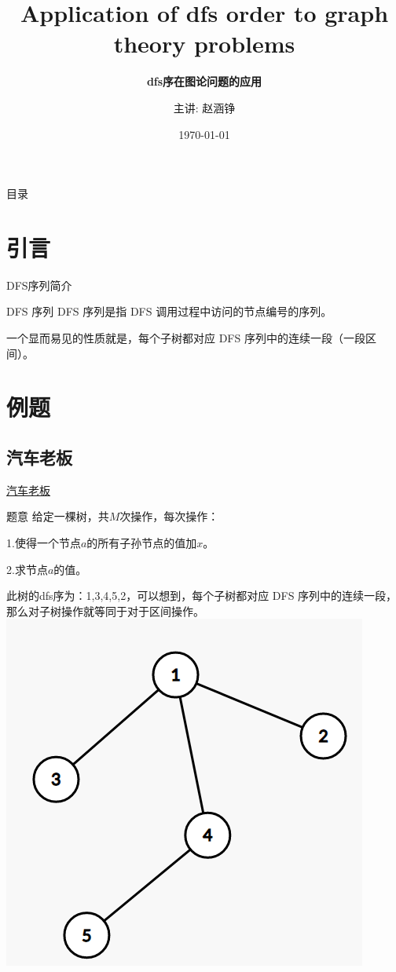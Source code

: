 \documentclass[10pt,aspectratio=43,mathserif,table]{beamer}
\title{Application of dfs order to graph theory problems}
\subtitle{\fontsize{9pt}{14pt}\textbf{dfs序在图论问题的应用}}
\author{主讲: 赵涵铮}
\institute{agile studio}
\date{\today}
\begin{document}
	
	\frame{\titlepage}
	
	\section[目录]{}   %
	\begin{frame}{目录}
		\tableofcontents
	\end{frame}
	
	\section{引言}  %
	\begin{frame}{DFS序列简介}
		\begin{block}{DFS 序列}
			DFS 序列是指 DFS 调用过程中访问的节点编号的序列。
			
			一个显而易见的性质就是，每个子树都对应 DFS 序列中的连续一段（一段区间）。
		\end{block}
	\end{frame}
	
	\section{例题}
	\subsection{汽车老板}
	\begin{frame}{\href{https://www.mfstem.org/p/1559}{汽车老板}}
		
		\begin{block}{题意}
			给定一棵树，共$M$次操作，每次操作：
			
			1.使得一个节点$a$的所有子孙节点的值加$x$。
			
			2.求节点$a$的值。
		\end{block}
	\end{frame}
	
	\begin{frame}
		此树的dfs序为：1,3,4,5,2，可以想到，每个子树都对应 DFS 序列中的连续一段，那么对子树操作就等同于对于区间操作。
		\includegraphics[width = 0.65\linewidth]{./figure/tree}		
	\end{frame}
	
\end{document}
